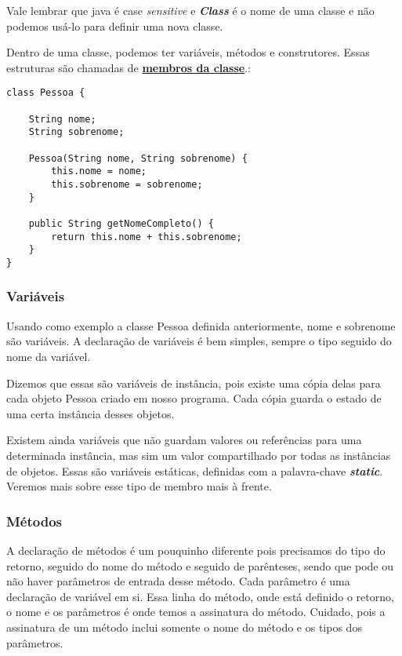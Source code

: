 \documentclass[12pt]{article}
\begin{document}
Vale lembrar que java é case \textit{sensitive} e \textbf{\textit{Class}} é o nome de uma classe e não podemos usá-lo para definir uma nova classe.

Dentro de uma classe, podemos ter variáveis, métodos e construtores. Essas estruturas são chamadas de \underline{\textbf{membros da classe}}.:

\begin{lstlisting}
class Pessoa {
	
	String nome;
	String sobrenome;
	
	Pessoa(String nome, String sobrenome) {
		this.nome = nome;
		this.sobrenome = sobrenome;
	}
	
	public String getNomeCompleto() {
		return this.nome + this.sobrenome;
	}
}	
\end{lstlisting}

\subsubsection{Variáveis}

Usando como exemplo a classe Pessoa definida anteriormente, nome e sobrenome são variáveis. A declaração de variáveis é bem simples, sempre o tipo seguido do nome da variável.

Dizemos que essas são variáveis de instância, pois existe uma cópia delas para cada objeto Pessoa criado em nosso programa. Cada cópia guarda o estado de uma certa instância desses objetos.

Existem ainda variáveis que não guardam valores ou referências para uma determinada instância, mas sim um valor compartilhado por todas as instâncias de objetos. Essas são variáveis estáticas, definidas com a palavra-chave \textbf{\textit{static}}. Veremos mais sobre esse tipo de membro mais à frente.

\subsubsection{Métodos}

A declaração de métodos é um pouquinho diferente pois precisamos do tipo do retorno, seguido do nome do método e seguido de parênteses, sendo que pode ou não haver parâmetros de entrada desse método. Cada parâmetro é uma declaração de variável em si. Essa linha do método, onde está definido o retorno, o nome e os parâmetros é onde temos a assinatura do método. Cuidado, pois a assinatura de um método inclui somente o nome do método e os tipos dos parâmetros.
\end{document}
